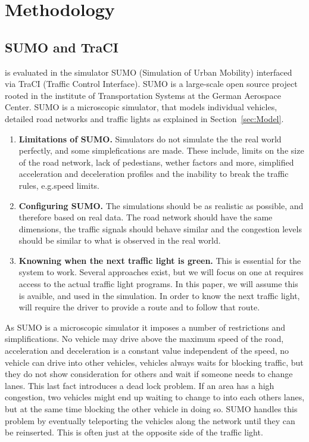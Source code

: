 \section{Methodology}\label{sec:methodology}

\subsection{SUMO and TraCI}
\tech is evaluated in the simulator SUMO (Simulation of Urban Mobility)\cite{sumo} interfaced via TraCI (Traffic Control Interface)\cite{traci}.
SUMO is a large-scale open source project rooted in the institute of Transportation Systems at the German Aerospace Center.
SUMO is a microscopic simulator, that models individual vehicles, detailed road networks and traffic lights as explained in Section~\ref{sec:Model}.

\begin{enumerate} %
\item \textbf{Limitations of SUMO.}
Simulators do not simulate the the real world perfectly, and some simplefications are made. 
These include, limits on the size of the road network, lack of pedestians, wether factors and more, simplified acceleration and deceleration profiles and the inability to break the traffic rules, e.g.speed limits.
\item \textbf{Configuring SUMO.}
The simulations should be as realistic as possible, and therefore based on real data. 
The road network should have the same dimensions, the traffic signals should behave similar and the congestion levels should be similar to what is observed in the real world.

\item \textbf{Knowning when the next traffic light is green.}
This is essential for the system to work.
Several approaches exist, but we will focus on one at requires access to the actual traffic light programs.
In this paper, we will assume this is avaible, and used in the simulation. 
In order to know the next traffic light, will require the driver to provide a route and to follow that route. 
\end{enumerate}


As SUMO is a microscopic simulator it imposes a number of restrictions and simplifications.
No vehicle may drive above the maximum speed of the road, acceleration and deceleration is a constant value independent of the speed, no vehicle can drive into other vehicles, vehicles always waits for blocking traffic, but they do not show consideration for others and wait if someone needs to change lanes.
This last fact introduces a dead lock problem.
If an area has a high congestion, two vehicles might end up waiting to change to into each others lanes, but at the same time blocking the other vehicle in doing so. 
SUMO handles this problem by eventually teleporting the vehicles along the network until they can be reinserted. 
This is often just at the opposite side of the traffic light.

